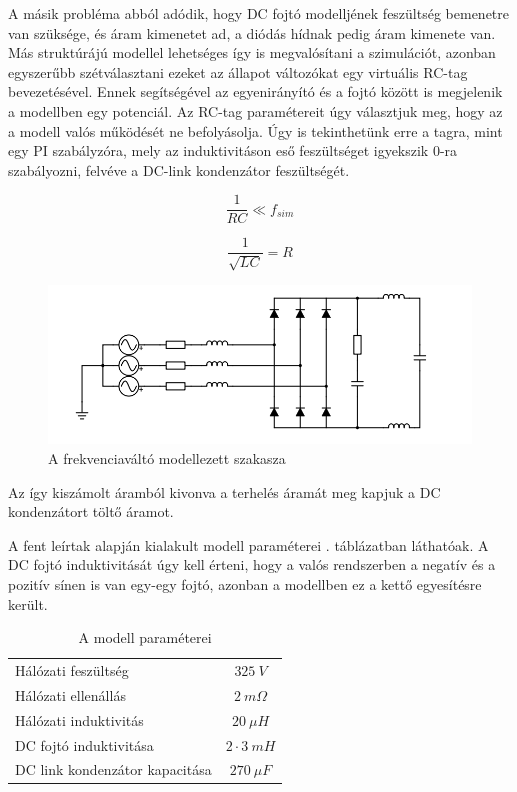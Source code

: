 A másik probléma abból adódik, hogy DC fojtó modelljének feszültség bemenetre van szüksége, és áram kimenetet ad, a diódás hídnak pedig áram kimenete van. Más struktúrájú modellel lehetséges így is megvalósítani a szimulációt, azonban egyszerűbb szétválasztani ezeket az állapot változókat egy virtuális RC-tag bevezetésével. Ennek segítségével az egyenirányító és a fojtó között is megjelenik a modellben egy potenciál. Az RC-tag paramétereit úgy választjuk meg, hogy az a modell valós működését ne befolyásolja. Úgy is tekinthetünk erre a tagra, mint egy PI szabályzóra, mely az induktivitáson eső feszültséget igyekszik $0$-ra szabályozni, felvéve a DC-link kondenzátor feszültségét.

\begin{equation}
\frac{1}{RC} \ll f_{sim}
\end{equation}

\begin{equation}
\frac{1}{\sqrt{LC}} = R
\end{equation}


\begin{figure}[H!]
	\centering
	\includegraphics[width = \textwidth]{figures/VFD_virtual_RC.png}
	\caption{A frekvenciaváltó modellezett szakasza} 
	\label{fig:virtualRC}
\end{figure}

Az így kiszámolt áramból kivonva a terhelés áramát meg kapjuk a DC kondenzátort töltő áramot.

A fent leírtak alapján kialakult modell paraméterei . táblázatban láthatóak. A DC fojtó induktivitását úgy kell érteni, hogy a valós rendszerben a negatív és a pozitív sínen is van egy-egy fojtó, azonban a modellben ez a kettő egyesítésre került.

\begin{table}[H]
\centering
\begin{tabular}{lS}
Hálózati feszültség            & $325\ V$ 		\\
Hálózati ellenállás            & $2\ m\Omega$   \\
Hálózati induktivitás          & $20\ \mu{}H$    			\\
DC fojtó induktivitása         & $2 \cdot{} 3\ mH$    			\\
DC link kondenzátor kapacitása & $270\ \mu{}F $   
\end{tabular}
\caption{A modell paraméterei}
\label{parameters}
\end{table}

